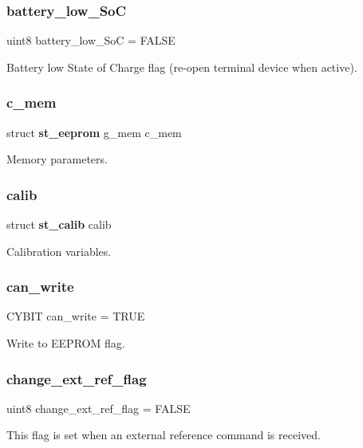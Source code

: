 \subsubsection{battery\+\_\+low\+\_\+\+SoC}
{\footnotesize\ttfamily uint8 battery\+\_\+low\+\_\+\+SoC = F\+A\+L\+SE}

Battery low State of Charge flag (re-\/open terminal device when active). \mbox{\label{globals_8c_a3ad3057028e3ab399e1d1549a8d67ab9}} 
\subsubsection{c\+\_\+mem}
{\footnotesize\ttfamily struct \textbf{ st\+\_\+eeprom} g\+\_\+mem c\+\_\+mem}

Memory parameters. \mbox{\label{globals_8c_aed96fdd8308fe2c4fc07c3b5db1c7bbb}} 
\subsubsection{calib}
{\footnotesize\ttfamily struct \textbf{ st\+\_\+calib} calib}

Calibration variables. \mbox{\label{globals_8c_acd57396ca1b2a02a76877acecd29ddb0}} 
\subsubsection{can\+\_\+write}
{\footnotesize\ttfamily C\+Y\+B\+IT can\+\_\+write = T\+R\+UE}

Write to E\+E\+P\+R\+OM flag. \mbox{\label{globals_8c_a55787e40db60be586171023875f15130}} 
\subsubsection{change\+\_\+ext\+\_\+ref\+\_\+flag}
{\footnotesize\ttfamily uint8 change\+\_\+ext\+\_\+ref\+\_\+flag = F\+A\+L\+SE}

This flag is set when an external reference command is received. \mbox{\label{globals_8c_a910e6d34a0bb2e8dbaf576e06bdf56f5}} 
